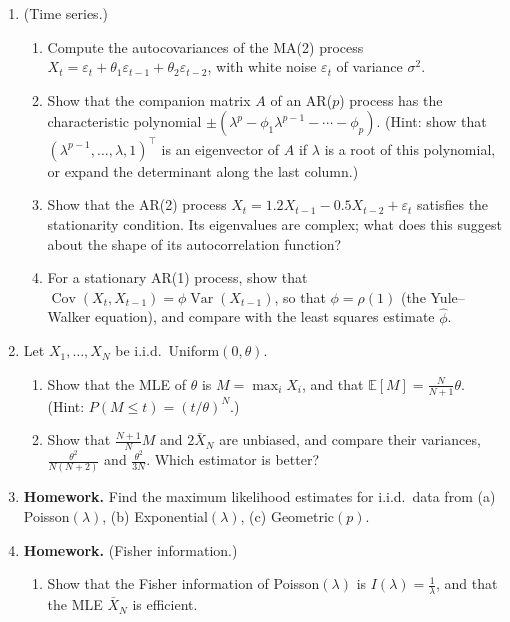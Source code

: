 \documentclass[11pt]{article}
\newcommand{\homework}{\textcolor{red!70!black}{\textbf{Homework.}}}
\newcommand{\E}{\mathbb{E}}
\DeclareMathOperator{\Var}{Var}
\DeclareMathOperator{\Cov}{Cov}
\theoremstyle{definition}
\theoremstyle{plain}
\theoremstyle{remark}
\begin{document}
\begin{enumerate}[leftmargin=*]
\begin{enumerate}[label=(\alph*)]
    \end{enumerate}
    \item\label{ex4:time-series} (Time series.)
    \begin{enumerate}[label=(\alph*)]
        \item Compute the autocovariances of the MA(2) process $X_t = \varepsilon_t + \theta_1\varepsilon_{t-1} + \theta_2\varepsilon_{t-2}$, with white noise $\varepsilon_t$ of variance $\sigma^2$.
        \item Show that the companion matrix $A$ of an AR($p$) process has the characteristic polynomial $\pm(\lambda^p - \phi_1\lambda^{p-1} - \cdots - \phi_p)$. (Hint: show that $(\lambda^{p-1}, \ldots, \lambda, 1)^\top$ is an eigenvector of $A$ if $\lambda$ is a root of this polynomial, or expand the determinant along the last column.)
        \item Show that the AR(2) process $X_t = 1.2X_{t-1} - 0.5X_{t-2} + \varepsilon_t$ satisfies the stationarity condition. Its eigenvalues are complex; what does this suggest about the shape of its autocorrelation function?
        \item For a stationary AR(1) process, show that $\Cov(X_t, X_{t-1}) = \phi\Var(X_{t-1})$, so that $\phi = \rho(1)$ (the Yule--Walker equation), and compare with the least squares estimate $\hat\phi$.
    \end{enumerate}
    \item\label{ex4:uniform-mle} Let $X_1, \ldots, X_N$ be i.i.d.\ Uniform$(0, \theta)$.
    \begin{enumerate}[label=(\alph*)]
        \item Show that the MLE of $\theta$ is $M = \max_i X_i$, and that $\E[M] = \frac{N}{N + 1}\theta$. (Hint: $P(M \leq t) = (t/\theta)^N$.)
        \item Show that $\frac{N + 1}{N}M$ and $2\bar X_N$ are unbiased, and compare their variances, $\frac{\theta^2}{N(N + 2)}$ and $\frac{\theta^2}{3N}$. Which estimator is better?
    \end{enumerate}
    \item \homework{} Find the maximum likelihood estimates for i.i.d.\ data from (a) Poisson$(\lambda)$, (b) Exponential$(\lambda)$, (c) Geometric$(p)$.
    \item\label{ex4:fisher} \homework{} (Fisher information.)
    \begin{enumerate}[label=(\alph*)]
        \item Show that the Fisher information of Poisson$(\lambda)$ is $I(\lambda) = \frac{1}{\lambda}$, and that the MLE $\bar X_N$ is efficient.

\end{enumerate}
\end{enumerate}
\end{document}
